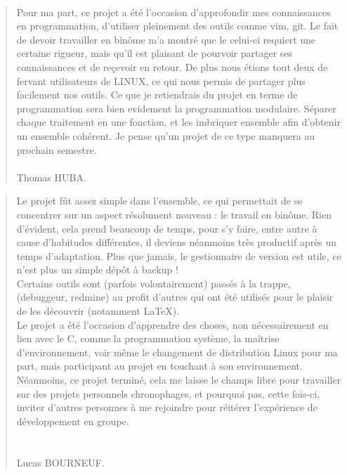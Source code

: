 \documentclass{report}
\begin{document}
    \paragraph*{} %
    \begin{quotation}
        Pour ma part, ce projet a été l'occasion d'approfondir mes connaissances en programmation, d'utiliser pleinement des outils comme vim, git. 
        Le fait de devoir travailler en binôme m'a montré que le celui-ci requiert une certaine rigueur, mais qu'il est plaisant de pourvoir partager ses connaissances et de reçevoir en retour. De plus nous étions tout deux de fervant utilisateurs de LINUX, ce qui nous permis de partager plus facilement nos outils. 
        Ce que je retiendrais du projet en terme de programmation sera bien evidement la programmation modulaire. Séparer chaque traitement en une fonction, et les imbriquer ensemble afin d'obtenir un ensemble cohérent. Je pense qu'un projet de ce type manquera au prochain semestre. \\ \\
        Thomas HUBA.
    \end{quotation}
    \vspace{2cm}
    \begin{quotation}
        Le projet fût assez simple dans l'ensemble, ce qui permettait de se concentrer sur un aspect résolument nouveau : le travail en binôme. 
        Rien d'évident, cela prend beaucoup de temps, pour s'y faire, entre autre à cause d'habitudes différentes, il deviens néanmoins très productif après un temps d'adaptation. 
            Plus que jamais, le gestionnaire de version est utile, ce n'est plus un simple dépôt à backup ! \\
            Certains outils sont (parfois volontairement) passés à la trappe, (debuggeur, redmine) au profit d'autres qui ont été utilisés pour le plaisir de les découvrir 
                (notamment \LaTeX). \\
            Le projet a été l'occasion d'apprendre des choses, non nécessairement en lien avec le C, comme la programmation système, la maîtrise d'environnement, 
            voir même le changement de distribution Linux pour ma part, mais participant au projet en touchant à son environnement.
            Néanmoins, ce projet terminé, cela me laisse le champs libre pour travailler sur des projets personnels chronophages, et pourquoi pas, cette fois-ci, 
                inviter d'autres personnes à me rejoindre pour réitérer l'expérience de développement en groupe. \\
            \\ \\
        Lucas BOURNEUF.
    \end{quotation}
\end{document}
